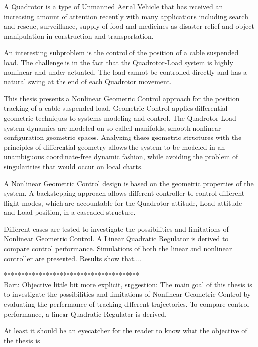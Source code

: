 
A Quadrotor is a type of Unmanned Aerial Vehicle that has received an increasing amount of attention recently with many applications including search and rescue, surveillance, supply of food and medicines as disaster relief and object manipulation in construction and transportation.

An interesting subproblem is the control of the position of a cable suspended load. The challenge is in the fact that the Quadrotor-Load system is highly nonlinear and under-actuated. The load cannot be controlled directly and has a natural swing at the end of each Quadrotor movement. 

This thesis presents a Nonlinear Geometric Control approach for the position tracking of a cable suspended load. Geometric Control applies differential geometric techniques to systems modeling and control.
The Quadrotor-Load system dynamics are modeled on so called manifolds, smooth nonlinear configuration geometric spaces. 
Analyzing these geometric structures with the principles of differential geometry allows the system to be modeled in an unambiguous coordinate-free dynamic fashion, while avoiding the problem of singularities that would occur on local charts. 

A Nonlinear Geometric Control design is based on the geometric properties of the system. A backstepping approach allows different controller to control different flight modes, which are accountable for the Quadrotor attitude, Load attitude and Load position, in a cascaded structure. 

Different cases are tested to investigate the possibilities and limitations of Nonlinear Geometric Control. A Linear Quadratic Regulator is derived to compare control performance. Simulations of both the linear and nonlinear controller are presented. 
Results show that....

***************************************\\
Bart: Objective little bit more explicit, suggestion: The main goal of this thesis is to investigate the possibilities and limitations of Nonlinear Geometric Control by evaluating the performance of tracking different trajectories. To compare control performance, a linear Quadratic Regulator is derived. 

At least it should be an eyecatcher for the reader to know what the objective of the thesis is

